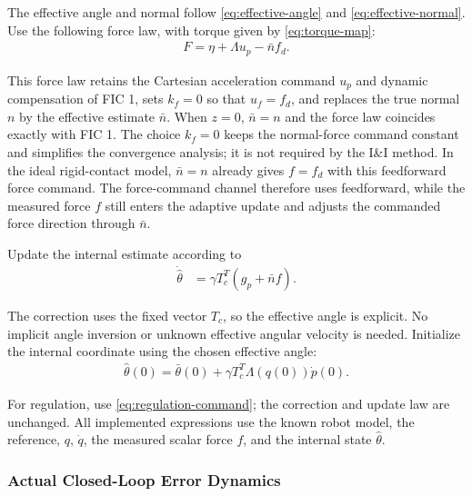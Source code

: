 \documentclass[10pt,journal,letterpaper]{IEEEtran}
\begin{document}
The effective angle and normal follow \eqref{eq:effective-angle} and \eqref{eq:effective-normal}. Use the following force law, with torque given by \eqref{eq:torque-map}:
\begin{equation}\label{eq:adaptive-force-law}
\begin{aligned}
F=\eta+\Lambda u_p-\bar n f_d.
\end{aligned}
\end{equation}

This force law retains the Cartesian acceleration command $u_p$ and dynamic compensation of FIC 1, sets $k_f=0$ so that $u_f=f_d$, and replaces the true normal $n$ by the effective estimate $\bar n$. When $z=0$, $\bar n=n$ and the force law coincides exactly with FIC 1. The choice $k_f=0$ keeps the normal-force command constant and simplifies the convergence analysis; it is not required by the I\&I method. In the ideal rigid-contact model, $\bar n=n$ already gives $f=f_d$ with this feedforward force command. The force-command channel therefore uses feedforward, while the measured force $f$ still enters the adaptive update and adjusts the commanded force direction through $\bar n$.

Update the internal estimate according to
\begin{equation}\label{eq:adaptive-update}
\begin{aligned}
\dot{\hat\theta}
&=\gamma T_c^T\left(g_p+\bar n f\right).
\end{aligned}
\end{equation}

The correction uses the fixed vector $T_c$, so the effective angle is explicit. No implicit angle inversion or unknown effective angular velocity is needed. Initialize the internal coordinate using the chosen effective angle:
\begin{equation}\label{eq:estimate-initialization}
\begin{aligned}
\hat\theta(0)
=\bar\theta(0)+\gamma T_c^T\Lambda(q(0))\dot p(0).
\end{aligned}
\end{equation}

For regulation, use \eqref{eq:regulation-command}; the correction and update law are unchanged. All implemented expressions use the known robot model, the reference, $q$, $\dot q$, the measured scalar force $f$, and the internal state $\hat\theta$.

\subsubsection{Actual Closed-Loop Error Dynamics}
\end{document}
